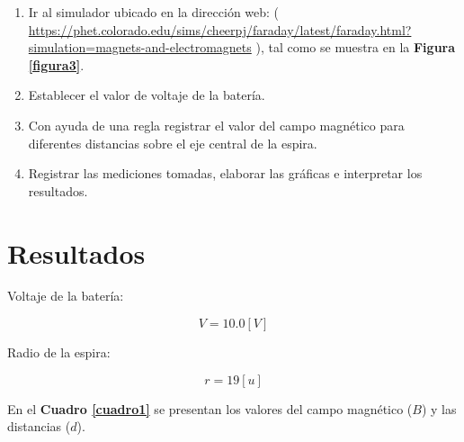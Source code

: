 \documentclass[letter,11pt]{article}
\begin{document}
\begin{enumerate}
\item Ir al simulador ubicado en la dirección web: (
\url{https://phet.colorado.edu/sims/cheerpj/faraday/latest/faraday.html?simulation=magnets-and-electromagnets}
), tal como se muestra en la \textbf{Figura \ref{figura3}}.
\item Establecer el valor de voltaje de la batería.
\item Con ayuda de una regla registrar el valor del campo magnético para
diferentes distancias sobre el eje central de la espira.
\item Registrar las mediciones tomadas, elaborar las gráficas e interpretar los
resultados.
\end{enumerate}

\section{Resultados}

Voltaje de la batería:

\begin{equation*}
    V = 10.0 [V]
\end{equation*}

Radio de la espira:

\begin{equation*}
    r = 19 [u]
\end{equation*}

En el \textbf{Cuadro \ref{cuadro1}} se presentan los valores del campo magnético
($B$) y las distancias ($d$).
\end{document}
